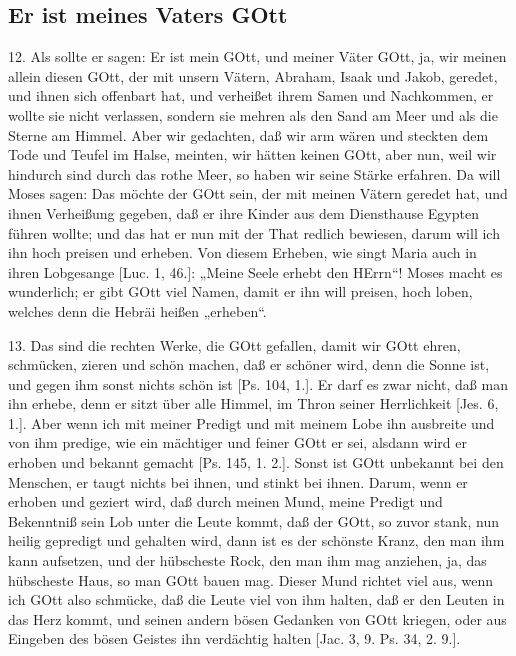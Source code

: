 \subsection{Er ist meines Vaters GOtt}

12. Als sollte er sagen: Er ist mein GOtt, und meiner Väter GOtt, ja, wir meinen allein diesen GOtt, der mit unsern Vätern, Abraham, Isaak und Jakob, geredet, und ihnen sich offenbart hat, und verheißet ihrem Samen und Nachkommen, er wollte sie nicht verlassen, sondern sie mehren als den Sand am Meer und als die Sterne am Himmel. Aber wir gedachten, daß wir arm wären und steckten dem Tode und Teufel im Halse, meinten, wir hätten keinen GOtt, aber nun, weil wir hindurch sind durch das rothe Meer, so haben wir seine Stärke erfahren. Da will Moses sagen: Das möchte der GOtt sein, der mit meinen Vätern geredet hat, und ihnen Verheißung gegeben, daß er ihre Kinder aus dem Diensthause Egypten führen wollte; und das hat er nun mit der That redlich bewiesen, darum will ich ihn hoch preisen und erheben. Von diesem Erheben, wie singt Maria auch in ihren Lobgesange [Luc. 1, 46.]: „Meine Seele erhebt den HErrn“! Moses macht es wunderlich; er gibt GOtt viel Namen, damit er ihn will preisen, hoch loben, welches denn die Hebräi heißen „erheben“.

13. Das sind die rechten Werke, die GOtt gefallen, damit wir GOtt ehren, schmücken, zieren und schön machen, daß er schöner wird, denn die Sonne ist, und gegen ihm sonst nichts schön ist [Ps. 104, 1.]. Er darf es zwar nicht, daß man ihn erhebe, denn er sitzt über alle Himmel, im Thron seiner Herrlichkeit [Jes. 6, 1.]. Aber wenn ich mit meiner Predigt und mit meinem Lobe ihn ausbreite und von ihm predige, wie ein mächtiger und feiner GOtt er sei, alsdann wird er erhoben und bekannt gemacht [Ps. 145, 1. 2.]. Sonst ist GOtt unbekannt bei den Menschen, er taugt nichts bei ihnen, und stinkt bei ihnen. Darum, wenn er erhoben und geziert wird, daß durch meinen Mund, meine Predigt und Bekenntniß sein Lob unter die Leute kommt, daß der GOtt, so zuvor stank, nun heilig gepredigt und gehalten wird, dann ist es der schönste Kranz, den man ihm kann aufsetzen, und der hübscheste Rock, den man ihm mag anziehen, ja, das hübscheste Haus, so man GOtt bauen mag. Dieser Mund richtet viel aus, wenn ich GOtt also schmücke, daß die Leute viel von ihm halten, daß er den Leuten in das Herz kommt, und seinen andern bösen Gedanken von GOtt kriegen, oder aus Eingeben des bösen Geistes ihn verdächtig halten [Jac. 3, 9. Ps. 34, 2. 9.].

